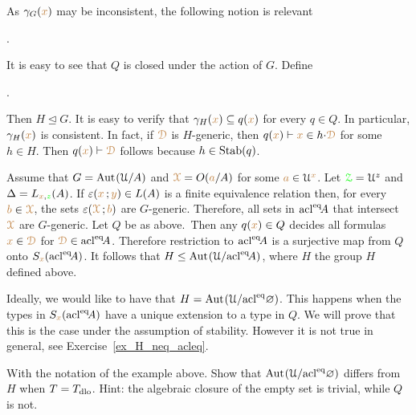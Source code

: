 As $\gamma_G({\color{brown} x})$ may be inconsistent, the following notion is relevant

.

It is easy to see that $Q$ is closed under the action of $G$.
Define 

.

Then $H\trianglelefteq G$.
It is easy to verify that $\gamma_H({\color{brown} x})\subseteq q({\color{brown} x})$ for every $q\in Q$.
In particular, $\gamma_H({\color{brown} x})$ is consistent.
In fact, if ${\color{brown}\EuScript D}$ is $H$-generic, then $q({\color{brown} x})\vdash {\color{brown}x}\in h{\cdot}{\color{brown}\EuScript D}$ for some $h\in H$.
Then $q({\color{brown} x})\vdash{\color{brown}\EuScript D}$ follows because $h\in{\rm Stab}(q)$.

\begin{example}
  Assume that $G={\rm Aut\kern.15ex}(\EuScript U/A)$ and ${\color{brown}\EuScript X}=O({\color{brown} a}/A)$ for some ${\color{brown} a}\in\EuScript U^{\color{brown} x}$.
  Let ${\color{green}\EuScript Z}=\EuScript U^z$ and $\Delta=L_{{\color{brown} x},{\color{green} z}}(A)$.
  If $\varepsilon({\color{brown} x}\,;{\color{brown} y})\in L(A)$ is a finite equivalence relation then, for every ${\color{brown} b}\in{\color{brown}\EuScript X}$, the sets $\varepsilon({\color{brown}\EuScript X}\,;{\color{brown} b})$ are $G$-generic.
  Therefore, all sets in ${\rm acl}^{{\rm eq}}\!A$ that intersect ${\color{brown}\EuScript X}$ are $G$-generic.
  Let $Q$ be as above.\
  Then any $q({\color{brown} x})\in Q$ decides all formulas ${\color{brown} x}\in{\color{brown}\EuScript D}$ for ${\color{brown}\EuScript D}\in{\rm acl}^{{\rm eq}}\!A$.
  Therefore restriction to ${\rm acl}^{{\rm eq}}\!A$ is a surjective map from $Q$ onto $S_{\color{brown} x}({\rm acl}^{{\rm eq}}\!A)$.
  It follows that $H\le{\rm Aut\kern.15ex}(\EuScript U/{\rm acl}^{{\rm eq}}\!A)$, where $H$ the group $H$ defined above.

  Ideally, we would like to have that $H={\rm Aut\kern.15ex}(\EuScript U/{\rm acl}^{{\rm eq}}\varnothing)$.
  This happens when the types in $S_{\color{brown} x}({\rm acl}^{{\rm eq}}\!A)$ have a unique extension to a type in $Q$.
  We will prove that this is the case under the assumption of stability.
  However it is not true in general, see Exercise~\ref{ex_H_neq_acleq}.
\end{example}

\begin{exercise}\label{ex_H_neq_acleq}
  With the notation of the example above.
  Show that ${\rm Aut\kern.15ex}(\EuScript U/{\rm acl}^{{\rm eq}}\varnothing)$ differs from $H$ when $T=T_{\rm dlo}$.
  Hint: the algebraic closure of the empty set is trivial, while $Q$ is not.
\end{exercise}

